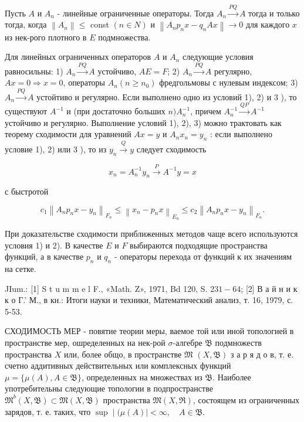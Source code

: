 \documentclass[10pt]{article}
\begin{document}
Пусть $A$ и $A_{n}$ - линейные ограниченные операторы. Тогда $A_{n} \stackrel{P Q}{\longrightarrow} A$ тогда и только тогда, когда $\left\|A_{n}\right\| \leqslant$ const $(n \in N)$ и $\left\|A_{n} p_{n} x-q_{n} A x\right\| \rightarrow 0$ для каждого $x$ из нек-рого плотного в $E$ подмножества.



Для линейных ограниченных операторов $A$ и $A_{n}$ следующие условия равносильны: 1) $A_{n} \stackrel{P Q}{\longrightarrow} A$ устойчиво, $A E=F$; 2) $A_{n} \stackrel{P Q}{\longrightarrow} A$ регулярно, $A x=0 \Rightarrow x=0$, операторы $A_{n}\left(n \geqslant n_{0}\right)$ фредгольмовы с нулевым индексом; 3) $A_{n} \stackrel{P Q}{\longrightarrow} A$ устойтиво и регулярно. Если выполнено одно из условий 1), 2) и 3 ), то существуют $A^{-1}$ и (при достаточно больших $n) A_{n}^{-1}$, причем $A_{n}^{-1} \stackrel{Q P}{\longrightarrow} A^{-1}$ устойчиво и регулярно. Выполнение условий 1), 2), 3) можно трактовать как теорему сходимости для уравнений $A x=y$ и $A_{n} x_{n}=y_{n}$ : если выполнено условие 1), 2) или 3 ), то из $y_{n} \stackrel{Q}{\longrightarrow} y$ следует сходимость



\[

x_{n}=A_{n}^{-1} y_{n} \stackrel{P}{\longrightarrow} A^{-1} y=x

\]



с быстротой



\[

c_{1}\left\|A_{n} p_{n} x-y_{n}\right\|_{F_{n}} \leqslant\left\|x_{n}-p_{n} x\right\|_{E_{n}} \leqslant c_{2}\left\|A_{n} p_{n} x-y_{n}\right\|_{F_{n}} .

\]



При доказательстве сходимости приближенных методов чаще всего используются условия 1) и 2). В качестве $E$ и $F$ выбираются подходящие пространства функций, а в качестве $p_{n}$ и $q_{n}$ - операторы перехода от функций к их значениям на сетке.



JIum.: [1] S t u m m e l F., «Math. Z», 1971, Bd 120, S. $231-64$; [2] В а й н и к к о Г.' М., в кн.: Итоги науки и техники, Математический анализ, т. 16, 1979, с. 5-53.



СХОДИМОСТЬ МЕР - повятие теории меры, ваемое той или иной топологией в пространстве мер, ошределенных на нек-рой $\sigma$-алгебре $\mathfrak{B}$ подмножеств пространства $X$ или, более общо, в пространстве $\mathfrak{M}$ $(X, \mathfrak{B})$ з а р я д о в, т. е. счетно аддитивных действительных или комплексных функций $\mu=\{\mu(A), A \in \mathfrak{B}\}$, определенных на множествах из $\mathfrak{B}$. Наиболее употребительны следующие топологии в подпространстве $\mathfrak{M}^{b}(X, \mathfrak{B}) \subset \mathfrak{M}(X, \mathfrak{B})$ пространства $\mathfrak{M}(X, \mathfrak{R})$, состоящем из ограниченных зарядов, т. е. таких, что $\sup \mid(\mu(A) \mid<\infty, \quad A \in \mathfrak{B}$.
\end{document}

